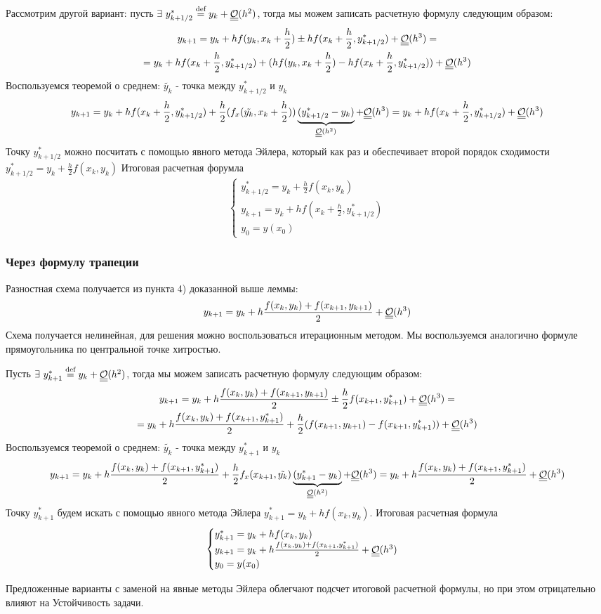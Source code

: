 Рассмотрим другой вариант: пусть $\exists\ y_{k+1/2}^*\defeq y_k+\bigO(h^2)$, тогда
мы можем записать расчетную формулу следующим образом:
\begin{multline*}
  y_{k+1}=y_{k}+hf(y_k, x_k+\frac{h}{2})\pm hf(x_k+\frac{h}{2},y_{k+1/2}^*)+\underline{\underline{\mathcal{O}}}(h^3)= \\
  = y_{k}+hf(x_k+\frac{h}{2},y_{k+1/2}^*)+ (hf(y_k, x_k+\frac{h}{2})-hf(x_k+\frac{h}{2},y_{k+1/2}^*))+\underline{\underline{\mathcal{O}}}(h^3)
\end{multline*}
Воспользуемся теоремой о среднем: $\tilde{y_k}$ - точка между $y_{k+1/2}^*$ и $y_k$
\[y_{k+1}= y_{k}+hf(x_k+\frac{h}{2},y_{k+1/2}^*)+ \frac{h}{2}(f_x(\tilde{y_k}, x_k+\frac{h}{2}))\underbrace{(y_{k+1/2}^*-y_k)}_{\underline{\underline{\mathcal{O}}}(h^2)}+\underline{\underline{\mathcal{O}}}(h^3)=y_{k}+hf(x_k+\frac{h}{2},y_{k+1/2}^*)+\underline{\underline{\mathcal{O}}}(h^3)\]
Точку $y_{k+1/2}^*$ можно посчитать с помощью явного метода Эйлера,
который как раз и обеспечивает второй порядок сходимости $y_{k+1/2}^*=y_k+\frac{h}{2}f(x_k,y_k)$
Итоговая расчетная форумла
\[\begin{cases}
    y_{k+1/2}^*=y_k+\frac{h}{2}f(x_k,y_k) \\
    y_{k+1}=y_{k}+hf(x_k+\frac{h}{2},y_{k+1/2}^*) \\
    y_0=y(x_0)
  \end{cases}\]

\subsubsection*{Через формулу трапеции}
Разностная схема получается из пункта 4) доказанной выше леммы:
\[y_{k+1}=y_k+h\frac{f(x_k,y_k)+f(x_{k+1},y_{k+1})}{2}+\underline{\underline{\mathcal{O}}}(h^3)\]
Схема получается нелинейная, для решения можно воспользоваться итерационным
методом. Мы воспользуемся аналогично формуле прямоугольника по центральной
точке хитростью.

Пусть $\exists\ y_{k+1}^*\stackrel{\text{def}}{=} y_k+\underline{\underline{\mathcal{O}}}(h^2)$, тогда
мы можем записать расчетную формулу следующим образом:
\begin{multline*}
  y_{k+1}=y_k+h\frac{f(x_k,y_k)+f(x_{k+1},y_{k+1})}{2}\pm\frac{h}{2}f(x_{k+1},y_{k+1}^*)+\underline{\underline{\mathcal{O}}}(h^3)= \\
  = y_k+h\frac{f(x_k,y_k)+f(x_{k+1},y_{k+1}^*)}{2}+\frac{h}{2}(f(x_{k+1},y_{k+1})-f(x_{k+1},y_{k+1}^*))+\underline{\underline{\mathcal{O}}}(h^3)
\end{multline*}
Воспользуемся теоремой о среднем: $\tilde{y_k}$ - точка между $y_{k+1}^*$ и $y_k$
\[y_{k+1}=y_k+h\frac{f(x_k,y_k)+f(x_{k+1},y_{k+1}^*)}{2}+\frac{h}{2}f_x(x_{k+1},\tilde{y_k})\underbrace{(y_{k+1}^*-y_k)}_{\underline{\underline{\mathcal{O}}}(h^2)}+\underline{\underline{\mathcal{O}}}(h^3)=y_k+h\frac{f(x_k,y_k)+f(x_{k+1},y_{k+1}^*)}{2}+\underline{\underline{\mathcal{O}}}(h^3)\]
Точку $y_{k+1}^*$ будем искать с помощью явного метода Эйлера $y_{k+1}^*=y_k+hf(x_k,y_k)$.
Итоговая расчетная формула
\[\begin{cases}
    y_{k+1}^*=y_k+hf(x_k,y_k)                                         \\
    y_{k+1}=y_k+h\frac{f(x_k,y_k)+f(x_{k+1},y_{k+1}^*)}{2}+\underline{\underline{\mathcal{O}}}(h^3) \\
    y_0=y(x_0)
  \end{cases}\]
\begin{remark}
  Предложенные варианты с заменой на явные методы Эйлера облегчают
  подсчет итоговой расчетной формулы, но при этом отрицательно влияют на Устойчивость
  задачи.
\end{remark}

